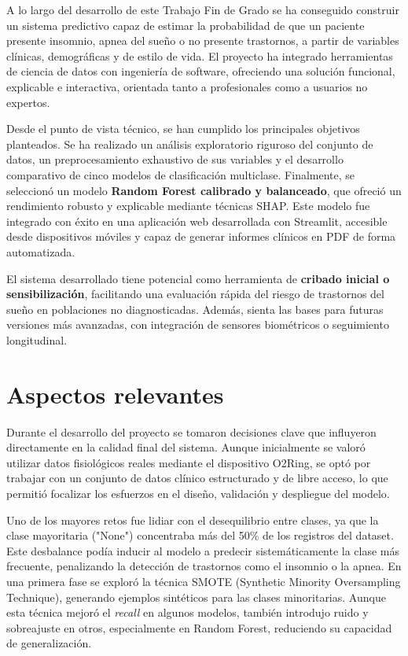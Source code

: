 
A lo largo del desarrollo de este Trabajo Fin de Grado se ha conseguido construir un sistema predictivo capaz de estimar la probabilidad de que un paciente presente insomnio, apnea del sueño o no presente trastornos, a partir de variables clínicas, demográficas y de estilo de vida. El proyecto ha integrado herramientas de ciencia de datos con ingeniería de software, ofreciendo una solución funcional, explicable e interactiva, orientada tanto a profesionales como a usuarios no expertos.

Desde el punto de vista técnico, se han cumplido los principales objetivos planteados. Se ha realizado un análisis exploratorio riguroso del conjunto de datos, un preprocesamiento exhaustivo de sus variables y el desarrollo comparativo de cinco modelos de clasificación multiclase. Finalmente, se seleccionó un modelo \textbf{Random Forest calibrado y balanceado}, que ofreció un rendimiento robusto y explicable mediante técnicas SHAP. Este modelo fue integrado con éxito en una aplicación web desarrollada con Streamlit, accesible desde dispositivos móviles y capaz de generar informes clínicos en PDF de forma automatizada.

El sistema desarrollado tiene potencial como herramienta de \textbf{cribado inicial o sensibilización}, facilitando una evaluación rápida del riesgo de trastornos del sueño en poblaciones no diagnosticadas. Además, sienta las bases para futuras versiones más avanzadas, con integración de sensores biométricos o seguimiento longitudinal.

\section{Aspectos relevantes}

Durante el desarrollo del proyecto se tomaron decisiones clave que influyeron directamente en la calidad final del sistema. Aunque inicialmente se valoró utilizar datos fisiológicos reales mediante el dispositivo O2Ring, se optó por trabajar con un conjunto de datos clínico estructurado y de libre acceso, lo que permitió focalizar los esfuerzos en el diseño, validación y despliegue del modelo.

Uno de los mayores retos fue lidiar con el desequilibrio entre clases, ya que la clase mayoritaria ("None") concentraba más del 50\% de los registros del dataset. Este desbalance podía inducir al modelo a predecir sistemáticamente la clase más frecuente, penalizando la detección de trastornos como el insomnio o la apnea. En una primera fase se exploró la técnica SMOTE (Synthetic Minority Oversampling Technique), generando ejemplos sintéticos para las clases minoritarias. Aunque esta técnica mejoró el \textit{recall} en algunos modelos, también introdujo ruido y sobreajuste en otros, especialmente en Random Forest, reduciendo su capacidad de generalización.


